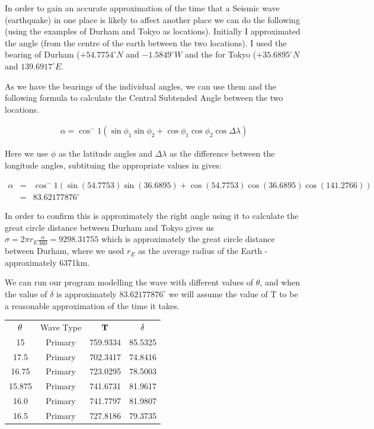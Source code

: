 \documentclass{mm2}
\begin{document}
\begin{answer}{5}
In order to gain an accurate approximation of the time that a Seismic wave (earthquake) in one place is likely to affect another place we can do the following (using the examples of Durham and Tokyo as locations).
Initially I approximated the angle (from the centre of the earth between the two locations).
I used the bearing of Durham ($+54.7754^{\circ} N$  and $-1.5849^{\circ} W$ and the for Tokyo ($+35.6895^{\circ} N$  and $139.6917^{\circ} E$.

As we have the bearings of the individual angles, we can use them and the following formula to calculate the Central Subtended Angle between the two locations.

\begin{eqnarray}
\alpha = \cos^-1 \left( \sin \phi_1 \sin \phi_2 + \cos \phi_1 \cos \phi_2 \cos \Delta \lambda \right)
\end{eqnarray} 

Here we use $\phi$ as the latitude angles and $\Delta \lambda$ as the difference between the longitude angles, subtituing the appropriate values in gives:

\begin{eqnarray}
\alpha &=& \cos^-1 \left( \sin (54.7753) \sin (36.6895) + \cos (54.7753) \cos (36.6895) \cos (141.2766) \right)\\
&=& 83.62177876^{\circ}
\end{eqnarray} 

In order to confirm this is approximately the right angle using it to calculate the great circle distance between Durham and Tokyo gives us $\sigma = 2\pi r_E \frac{\alpha}{360} = 9298.31755$ which is approximately the great circle distance between Durham, where we used $r_E$ as the average radius of the Earth - approximately 6371km.

We can run our program modelling the wave with different values of $\theta$, and when the value of $\delta$ is approximately $83.62177876^{\circ}$ we will assume the value of T to be a reasonable approximation of the time it takes.


\begin{center}
\begin{tabular}{ |c|c|c|c| } 
 \hline
 ${\bf \theta}$ & Wave Type & ${\bf T}$ & ${\bf \delta}$\\
 15 & Primary & 759.9334 & 85.5325 \\ 
 17.5 & Primary & 702.3417 & 74.8416 \\ 
 16.75 & Primary & 723.0295 & 78.5003 \\ 
 15.875 & Primary & 741.6731 & 81.9617 \\ 
 16.0 & Primary & 741.7797 & 81.9807 \\
 16.5 & Primary & 727.8186 & 79.3735\\ 
 \hline
\end{tabular}
\end{center}


\end{answer}
\end{document}
